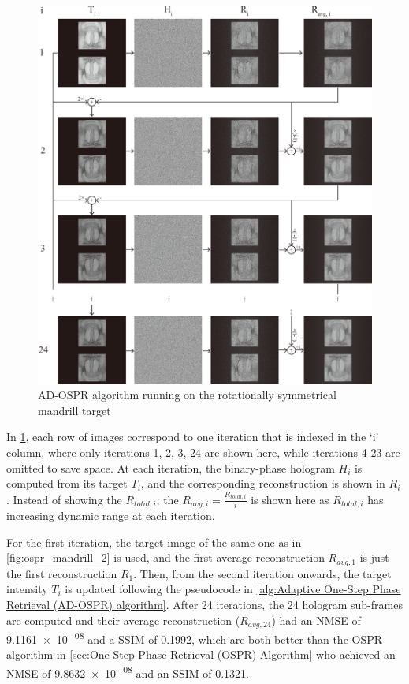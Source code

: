\begin{figure}[H]
	\centering
	\includegraphics[width=1.0\textwidth]{adospr_mandrill_2.pdf}
	\caption{AD-OSPR algorithm running on the rotationally symmetrical mandrill target}
	\label{fig:adospr_mandrill_2}
\end{figure}

In \cref{fig:adospr_mandrill_2}, each row of images correspond to one iteration that is indexed in the `i' column, where only iterations 1, 2, 3, 24 are shown here, while iterations 4-23 are omitted to save space. At each iteration, the binary-phase hologram $H_i$ is computed from its target $T_i$, and the corresponding reconstruction is shown in $R_i$. Instead of showing the $R_{total, i}$, the $R_{avg, i}=\frac{R_{total, i}}{i}$ is shown here as $R_{total, i}$ has increasing dynamic range at each iteration.

For the first iteration, the target image of the same one as in \cref{fig:ospr_mandrill_2} is used, and the first average reconstruction $R_{avg, 1}$ is just the first reconstruction $R_1$. Then, from the second iteration onwards, the target intensity $T_i$ is updated following the pseudocode in \cref{alg:Adaptive One-Step Phase Retrieval (AD-OSPR) algorithm}. After 24 iterations, the 24 hologram sub-frames are computed and their average reconstruction ($R_{avg, 24}$) had an NMSE of \num{9.1161e-08} and a SSIM of 0.1992, which are both better than the OSPR algorithm in \cref{sec:One Step Phase Retrieval (OSPR) Algorithm} who achieved an NMSE of \num{9.8632e-08} and an SSIM of 0.1321.

